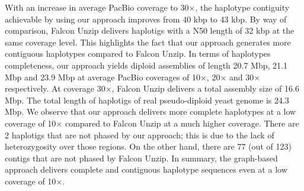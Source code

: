 With an increase in average PacBio coverage to 30$\times$, the haplotype contiguity achievable by using our approach improves from 40 kbp to 43 kbp.
By way of comparison, Falcon Unzip delivers haplotigs with a N50 length of 32 kbp at the same coverage level. This highlights the fact that our approach generates more contiguous haplotypes compared to Falcon Unzip.
In terms of haplotypes completeness, our approach yields diploid assemblies of length 20.7 Mbp, 21.1 Mbp and 23.9 Mbp at average PacBio coverages of 10$\times$, 20$\times$ and 30$\times$ respectively.
At coverage 30$\times$, Falcon Unzip delivers a total assembly size of 16.6 Mbp.
The total length of haplotigs of real pseudo-diploid yeast genome is 24.3 Mbp.
We observe that our approach delivers more complete haplotypes at a low coverage of 10$\times$ compared to Falcon Unzip at a much higher coverage.
There are 2 haplotigs that are not phased by our approach; this is due to the lack of heterozygosity over those regions.
On the other hand, there are 77 (out of 123) contigs that are not phased by Falcon Unzip.
In summary, the graph-based approach delivers complete and contiguous haplotype sequences even at a low coverage of 10$\times$.

